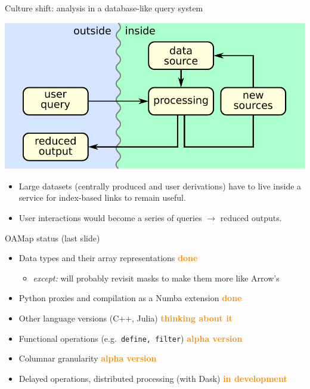\documentclass[aspectratio=169]{beamer}
\begin{document}
\begin{frame}{Culture shift: analysis in a database-like query system}
\vspace{0.5 cm}

\begin{center}
\includegraphics[width=0.65\linewidth]{basic-block-diagram.pdf}
\end{center}

\begin{itemize}
\item Large datasets (centrally produced and user derivations) have to live inside a service for index-based links to remain useful.
\item User interactions would become a series of queries $\to$ reduced outputs.
\end{itemize}
\end{frame}

\begin{frame}{OAMap status (last slide)}
\vspace{0.5 cm}
\large
\begin{itemize}\setlength{\itemsep}{0.5 cm}
\item Data types and their array representations \hfill \textcolor{darkorange}{\bf done\hspace{-0.15 cm}}
\begin{itemize}
\item {\it except:} will probably revisit masks to make them more like Arrow's
\end{itemize}

\item Python proxies and compilation as a Numba extension \hfill \textcolor{darkorange}{\bf done}

\item Other language versions (C++, Julia) \hfill \textcolor{darkorange}{\bf thinking about it}

\item Functional operations (e.g.\ {\tt\normalsize define, filter}) \hfill \textcolor{darkorange}{\bf alpha version}

\item Columnar granularity \hfill \textcolor{darkorange}{\bf alpha version}

\item Delayed operations, distributed processing (with Dask) \hfill \textcolor{darkorange}{\bf in development}
\end{itemize}
\end{frame}
\end{document}
